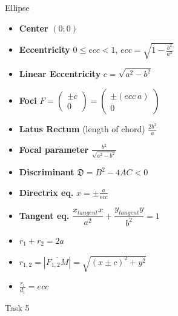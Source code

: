 \documentclass[aspectratio=169,notes]{beamer}
\begin{document}
\begin{frame}[t]{Ellipse}
\begin{multicols}{3}
\begin{itemize}
            \item \textbf{Center} $(0;0)$
            \item \textbf{Eccentricity} $0 \leq ecc < 1$, $ecc = \sqrt{1 - \frac{b^2}{a^2}}$
            \item \textbf{Linear Eccentricity} $c = \sqrt{a^2-b^2}$
            \item \textbf{Foci} $F = \begin{pmatrix} \pm c\\ 0 \end{pmatrix} = \begin{pmatrix} \pm(ecc\ a)\\ 0 \end{pmatrix}$
            \item \textbf{Latus Rectum} (length of chord) $\frac{2b^2}{a}$
            \item \textbf{Focal parameter}  $\frac{b^2}{\sqrt{a^2-b^2}}$
            \item \textbf{Discriminant} $\mathfrak{D} = B^2 - 4AC < 0$
            \item \textbf{Directrix eq.} $x = \pm \frac{a}{ecc}$
            \item \textbf{Tangent eq.} $\dfrac{x_{tangent} x}{a^2}+\dfrac{y_{tangent} y}{b^2}=1$
            \item $r_1 + r_2 = 2a$
            \item $r_{1,2} = |\overline{F_{1,2}M}|=\sqrt{(x \pm c)^2+y^2}$
            \item $\frac{r_1}{d_1}=ecc$
            \end{itemize}
    \end{multicols}
    \end{frame}

    \begin{frame}[t]{Task 5}
        \framesubtitle{}
    \end{frame}
\end{document}
